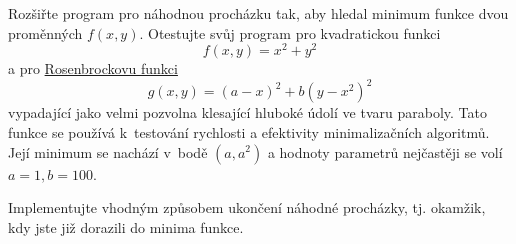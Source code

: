 \documentclass[a4paper,11pt,twoside]{article}
\begin{document}
    \begin{task}
        Rozšiřte program pro náhodnou procházku tak, aby hledal minimum funkce dvou proměnných $f(x,y)$.
        Otestujte svůj program pro kvadratickou funkci
        \begin{equation}\label{eq:Minimizef}
            f(x,y)=x^{2}+y^{2}
        \end{equation}
        a pro \href{https://en.wikipedia.org/wiki/Rosenbrock_function}{Rosenbrockovu funkci}
        \begin{equation}\label{eq:Minimizeg}
            g(x,y)=(a-x)^{2}+b\left(y-x^{2}\right)^{2}        
        \end{equation}
        vypadající jako velmi pozvolna klesající hluboké údolí ve tvaru paraboly.
        Tato funkce se používá k~testování rychlosti a efektivity minimalizačních algoritmů.
        Její minimum se nachází v~bodě $\left(a,a^{2}\right)$ a hodnoty parametrů nejčastěji se volí $a=1,b=100$.   
        
        Implementujte vhodným způsobem ukončení náhodné procházky, tj. okamžik, kdy jste již dorazili do minima funkce.
    \end{task}
\end{document}

